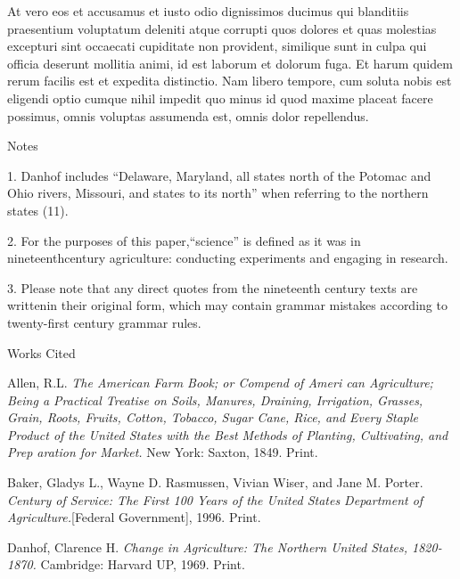 \documentclass[12pt]{article}
\newcommand{\bibent}{\noindent \hangindent 40pt}
\newenvironment{workscited}{\newpage \begin{center} Works Cited \end{center}}{\newpage }
\begin{document}
\begin{flushleft}
			At vero eos et accusamus et iusto odio dignissimos ducimus qui blanditiis praesentium voluptatum deleniti atque corrupti quos dolores et quas molestias excepturi sint occaecati cupiditate non provident, similique sunt in culpa qui officia deserunt mollitia animi, id est laborum et dolorum fuga. Et harum quidem rerum facilis est et expedita distinctio. Nam libero tempore, cum soluta nobis est eligendi optio cumque nihil impedit quo minus id quod maxime placeat facere possimus, omnis voluptas assumenda est, omnis dolor repellendus. 
			\newpage
			
			
			\begin{center}
				Notes
			\end{center}
			
			
			\setlength{\parindent}{0.5in}
			
			1. Danhof includes “Delaware, Maryland, all states north of the Potomac and Ohio rivers, Missouri, and states to its north” when referring to the northern states (11).
			
			
			2. For the purposes of this paper,“science” is defined as it was in nineteenthcentury agriculture: conducting experiments and engaging in research.
			
			
			3. Please note that any direct quotes from the nineteenth century texts are writtenin their original form, which may contain grammar mistakes according to twenty-first century grammar rules.
			
			\begin{workscited}
				
				\bibent
				Allen, R.L. \textit{The American Farm Book; or Compend of Ameri can Agriculture; Being a Practical Treatise on Soils, Manures, Draining, Irrigation, Grasses, Grain, Roots, Fruits, Cotton, Tobacco, Sugar Cane, Rice, and Every Staple Product of the United States with the Best Methods of Planting, Cultivating, and Prep aration for Market.} New York: Saxton, 1849. Print.
				
				\bibent
				Baker, Gladys L., Wayne D. Rasmussen, Vivian Wiser, and Jane M. Porter. \textit{Century of Service: The First 100 Years of the United States Department of Agriculture.}[Federal Government], 1996. Print.
				
				\bibent
				Danhof, Clarence H. \textit{Change in Agriculture: The Northern United States, 1820-1870.} Cambridge: Harvard UP, 1969. Print.
				
				
			\end{workscited}
			
		\end{flushleft}
	
\end{document}
